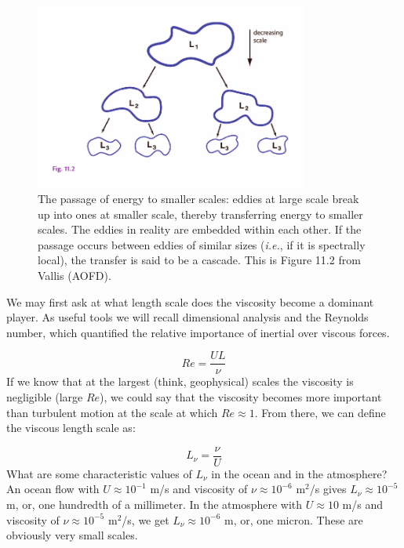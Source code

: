 \documentclass[12pt]{article}
\numberwithin{equation}{section}
\numberwithin{figure}{section}
\numberwithin{table}{section}
\begin{document}
\begin{figure}[h]
  \centering
  \includegraphics[width=0.8\textwidth]{assets/fig_turbulent_energy_cascade.pdf}
  \caption{
    The passage of energy to smaller scales: eddies at large scale break up
    into ones at smaller scale, thereby transferring energy to smaller scales.
    The eddies in reality are embedded within each other.
    If the passage occurs between eddies of similar sizes (\textit{i.e.}, if
    it is spectrally local), the transfer is said to be a cascade.
    This is Figure 11.2 from Vallis (AOFD).
  }
  \label{fig:turbulent_cascade}
\end{figure}

We may first ask at what length scale does the viscosity become a dominant
player.
As useful tools we will recall dimensional analysis and the Reynolds number,
which quantified the relative importance of inertial over viscous forces.

\begin{equation}
  Re = \frac{UL}{\nu}
\end{equation}
If we know that at the largest (think, geophysical) scales the viscosity is
negligible (large $Re$), we could say that the viscosity becomes more important
than turbulent motion at the scale at which $Re \approx 1$.
From there, we can define the viscous length scale as:

\begin{equation}
  L_\nu = \frac{\nu}{U}
  \label{eq:viscous_length_scale}
\end{equation}
What are some characteristic values of $L_\nu$ in the ocean and in the atmosphere?
An ocean flow with $U \approx 10^{-1}$ m/s and viscosity of $\nu \approx 10^{-6}$ m$^2$/s
gives $L_\nu \approx 10^{-5}$ m, or, one hundredth of a millimeter.
In the atmosphere with $U \approx 10$ m/s and viscosity of $\nu \approx 10^{-5}$ m$^2$/s,
we get $L_\nu \approx 10^{-6}$ m, or, one micron.
These are obviously very small scales.
\end{document}
